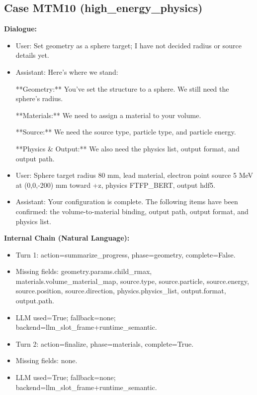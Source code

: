 \documentclass[11pt]{ctexart}
\begin{document}
\subsection{Case MTM10 (high\_energy\_physics)}
\textbf{Dialogue:}
\begin{itemize}
\item User: Set geometry as a sphere target; I have not decided radius or source details yet.
\item Assistant: Here's where we stand:

**Geometry:** You've set the structure to a sphere. We still need the sphere's radius.

**Materials:** We need to assign a material to your volume.

**Source:** We need the source type, particle type, and particle energy.

**Physics \& Output:** We also need the physics list, output format, and output path.
\item User: Sphere target radius 80 mm, lead material, electron point source 5 MeV at (0,0,-200) mm toward +z, physics FTFP\_BERT, output hdf5.
\item Assistant: Your configuration is complete. The following items have been confirmed: the volume-to-material binding, output path, output format, and physics list.
\end{itemize}
\textbf{Internal Chain (Natural Language):}
\begin{itemize}
\item Turn 1: action=summarize\_progress, phase=geometry, complete=False.
\item Missing fields: geometry.params.child\_rmax, materials.volume\_material\_map, source.type, source.particle, source.energy, source.position, source.direction, physics.physics\_list, output.format, output.path.
\item LLM used=True; fallback=none; backend=llm\_slot\_frame+runtime\_semantic.
\item Turn 2: action=finalize, phase=materials, complete=True.
\item Missing fields: none.
\item LLM used=True; fallback=none; backend=llm\_slot\_frame+runtime\_semantic.
\end{itemize}
\end{document}
